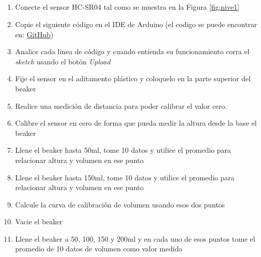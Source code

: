 \subsection{\pro}
\begin{enumerate}
    \item Conecte el sensor HC-SR04 tal como se muestra en la Figura \ref{fig:nive1}
    \item Copie el siguiente código en el IDE de Arduino (el codigo se puede encontrar en: \href{https://github.com/juanjorojash/instrumentacion_I/blob/master/code/L05/L05.ino}{GitHub})
      
    \item Analice cada linea de código y cuando entienda su funcionamiento corra el \emph{sketch} usando el botón \emph{Upload}
    \item Fije el sensor en el aditamento plástico y coloquelo en la parte superior del beaker  
    \item Realice una medición de distancia para poder calibrar el valor cero.
    \item Calibre el sensor en cero de forma que pueda medir la altura desde la base el beaker
    \item Llene el beaker hasta 50ml, tome 10 datos y utilice el promedio para relacionar altura y volumen en ese punto
    \item Llene el beaker hasta 150ml, tome 10 datos y utilice el promedio para relacionar altura y volumen en ese punto
    \item Calcule la curva de calibración de volumen usando esos dos puntos
    \item Vacie el beaker
    \item Llene el beaker a 50, 100, 150 y 200ml y en cada uno de esos puntos tome el promedio de 10 datos de volumen como valor medido
\end{enumerate}

